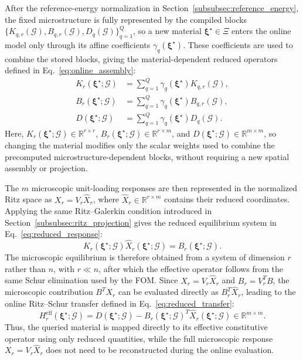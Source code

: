 \documentclass[pdflatex,sn-basic,Numbered]{sn-jnl}
\newcommand{\R}{\mathbb{R}}
\newcommand{\G}{\mathcal{G}}
\newcommand{\Hr}{H^{\mathrm{eff}}_r}
\begin{document}
After the reference-energy normalization in
Section~\ref{subsubsec:reference_energy}, the fixed microstructure is fully
represented by the compiled blocks
\(\{K_{q,r}(\G),B_{q,r}(\G),D_q(\G)\}_{q=1}^{Q}\), so a new material
\(\boldsymbol\xi^\star\in\Xi\) enters the online model only through its affine
coefficients \(\gamma_q(\boldsymbol\xi^\star)\). These coefficients are used
to combine the stored blocks, giving the material-dependent reduced operators
defined in Eq.~\eqref{eq:online_assembly}:
\begin{equation}
\label{eq:online_assembly}
\begin{aligned}
K_r(\boldsymbol\xi^\star;\G)
&=
\sum_{q=1}^{Q}
\gamma_q(\boldsymbol\xi^\star)K_{q,r}(\G),
\\
B_r(\boldsymbol\xi^\star;\G)
&=
\sum_{q=1}^{Q}
\gamma_q(\boldsymbol\xi^\star)B_{q,r}(\G),
\\
D(\boldsymbol\xi^\star;\G)
&=
\sum_{q=1}^{Q}
\gamma_q(\boldsymbol\xi^\star)D_q(\G).
\end{aligned}
\end{equation}
Here,
\(K_r(\boldsymbol\xi^\star;\G)\in\R^{r\times r}\),
\(B_r(\boldsymbol\xi^\star;\G)\in\R^{r\times m}\), and
\(D(\boldsymbol\xi^\star;\G)\in\R^{m\times m}\), so changing the material
modifies only the scalar weights used to combine the precomputed
microstructure-dependent blocks, without requiring a new spatial assembly or
projection.

The \(m\) microscopic unit-loading responses are then represented in the
normalized Ritz space as
\(X_r=V_r\widehat X_r\), where
\(\widehat X_r\in\R^{r\times m}\) contains their reduced coordinates.
Applying the same Ritz--Galerkin condition introduced in
Section~\ref{subsubsec:ritz_projection} gives the reduced equilibrium system
in Eq.~\eqref{eq:reduced_response}:
\begin{equation}
\label{eq:reduced_response}
K_r(\boldsymbol\xi^\star;\G)
\widehat X_r(\boldsymbol\xi^\star;\G)
=
B_r(\boldsymbol\xi^\star;\G).
\end{equation}
The microscopic equilibrium is therefore obtained from a system of dimension
\(r\) rather than \(n\), with \(r\ll n\), after which the effective operator
follows from the same Schur elimination used by the FOM. Since
\(X_r=V_r\widehat X_r\) and \(B_r=V_r^TB\), the microscopic contribution
\(B^TX_r\) can be evaluated directly as
\(B_r^T\widehat X_r\), leading to the online Ritz--Schur transfer defined in
Eq.~\eqref{eq:reduced_transfer}:
\begin{equation}
\label{eq:reduced_transfer}
\Hr(\boldsymbol\xi^\star;\G)
=
D(\boldsymbol\xi^\star;\G)
-
B_r(\boldsymbol\xi^\star;\G)^T
\widehat X_r(\boldsymbol\xi^\star;\G)
\in\R^{m\times m}.
\end{equation}
Thus, the queried material is mapped directly to its effective constitutive
operator using only reduced quantities, while the full microscopic response
\(X_r=V_r\widehat X_r\) does not need to be reconstructed during the online
evaluation.
\end{document}
